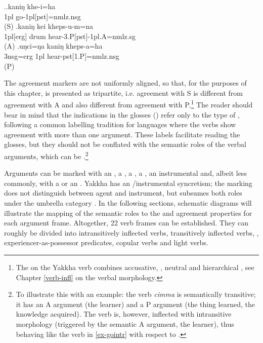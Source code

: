 \ex.\ag.\label{ex-gointr}kaniŋ khe-i=ha\\
{\sc 1pl} go{\sc -1pl[pst]=nmlz.nsg}\\
 (S)
\bg.kaniŋ kei kheps-u-m=na\\
{\sc 1pl[erg]} drum hear{\sc -3.P[pst]-1pl.A=nmlz.sg}\\
 (A)
\bg.uŋci=ŋa kaniŋ kheps-a=ha\\
{\sc 3nsg=erg} {\sc 1pl}  hear{\sc -pst[1.P]=nmlz.nsg}\\
 (P)


The agreement markers are not uniformly aligned, so that, for the purposes of this chapter,  is  presented as tripartite, i.e. agreement with S is different from agreement with A and also different from agreement with P.\footnote{The  on the Yakkha verb combines accusative, , neutral and hierarchical , see Chapter \ref{verb-infl} on the verbal morphology.} The reader should bear in mind that the indications in the glosses () refer only to the type of , following a common labelling tradition for languages where the verbs show agreement with more than one argument. These labels facilitate reading  the glosses, but they should not be conflated with the semantic roles of the verbal arguments, which can be .\footnote{To illustrate this with an example: the verb \emph{cimma}  is semantically transitive; it has an A argument (the learner) and a P argument (the thing learned, the knowledge acquired). The verb  is, however, inflected with intransitive morphology (triggered by the semantic A argument, the learner), thus behaving like the verb in  \ref{ex-gointr} with respect to .} 

Arguments can be marked with an , a , a , a , an instrumental and, albeit less commonly, with a  or an . Yakkha has an /instrumental syncretism; the  marking does not distinguish between agent and instrument, but subsumes both roles under the umbrella category  \citep{VanValinetal1996The-case}. In the following sections, schematic diagrams will illustrate the mapping of the semantic roles to the  and agreement properties for each argument frame. Altogether, 22 verb frames can be established. They can roughly be divided into intransitively inflected verbs, transitively inflected verbs, , experiencer-as-possessor predicates, copular verbs and light verbs.


